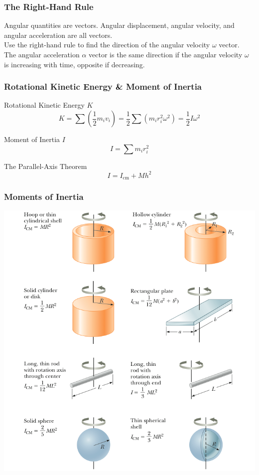 \documentclass[table,letterpaper]{beamer}
\begin{document}
\begin{frame}
\frametitle{The Right-Hand Rule}
\vfill
Angular quantities are vectors. Angular displacement, angular velocity, and angular acceleration are all vectors.\\
\vfill
Use the right-hand rule to find the direction of the angular velocity $\omega$ vector.\\
\vfill
The angular acceleration $\alpha$ vector is the same direction if the angular velocity $\omega$ is increasing with time, opposite if decreasing.
\vfill
\end{frame}

\begin{frame}
\frametitle{Rotational Kinetic Energy \& Moment of Inertia}
\begin{block}{Rotational Kinetic Energy $K$}
$$K = \sum \left(\frac{1}{2}m_iv_i\right) = \frac{1}{2}\sum \left(m_ir_i^2\omega^2\right) = \frac{1}{2}I\omega^2$$
\end{block}

\begin{block}{Moment of Inertia $I$}
$$I = \sum m_ir_i^2$$
\end{block}

\begin{block}{The Parallel-Axis Theorem}
$$I = I_\text{cm} + Mh^2$$
\end{block}
\end{frame}

\begin{frame}
\frametitle{Moments of Inertia}
\begin{center}
\includegraphics[height=0.9\textheight]{inertia.png}
\end{center}
\end{frame}
\end{document}
